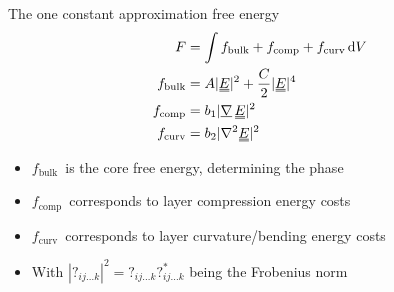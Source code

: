 \documentclass[10pt,mathserif]{beamer}
\newcommand{\suf}[2]{\stackunder[0.5pt]{\stackunder[1pt]{\ensuremath{#1}}{\rule{\widthof{\ensuremath{#2}}*\real{0.9}}{.1ex}}}{}}
\newcommand{\duf}[2]{\stackunder[0.5pt]{\stackunder[0.8pt]{\stackunder[1pt]{\ensuremath{#1}}{\rule{\widthof{\ensuremath{#2}}*\real{0.9}}{.1ex}}}{\rule{\widthof{\ensuremath{#2}}*\real{0.9}}{.1ex}}}{}}
\newcommand{\su}[1]{\suf{#1}{#1}}
\newcommand{\du}[1]{\duf{#1}{#1}}
\newcommand{\mgrad}{\ensuremath{\suf{\nabla}{K}\,}}
\newcommand{\EE}{\ensuremath{\du{E}}}
\newcommand{\FB}{\ensuremath{f_\text{bulk}}}
\newcommand{\FC}{\ensuremath{f_\text{comp}}}
\newcommand{\FU}{\ensuremath{f_\text{curv}}}
\newcommand{\extra}[1]{\color{gray} #1 \normalcolor}
\begin{document}

\begin{frame}[fragile]{The one constant approximation free energy}
    \newrefsection
    \begin{align*}
        F &= \int f_\text{bulk} + f_\text{comp} + f_\text{curv} \dd{V} \\
        f_\text{bulk} &= A |\EE|^2 + \frac{C}{2} |\EE|^4 \\
        f_\text{comp} &= b_1 |\mgrad \EE|^2 \\
        f_\text{curv} &= b_2 |\nabla^2 \EE|^2
    \end{align*}
    \begin{itemize}
        \item \FB\ is the core free energy, determining the phase
        \item \FC\ corresponds to layer compression energy costs
        \item \FU\ corresponds to layer curvature/bending energy costs
        \extra{\item With $|?_{ij\ldots k}|^2=?_{ij\ldots k}?_{ij\ldots k}^*$ being the Frobenius norm}
    \end{itemize}
\end{frame}
\end{document}
